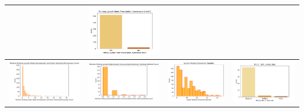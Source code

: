 \begin{center}
\begin{tabular}{ |c|c|c|c| }
		& \includegraphics[width=.25\textwidth]{NOTEBOOK/IMAGENES_CRUDAS/52} 
		\\  \hline
		\includegraphics[width=.25\textwidth]{NOTEBOOK/IMAGENES_CRUDAS/53} 
		& \includegraphics[width=.25\textwidth]{NOTEBOOK/IMAGENES_CRUDAS/54} 
		& \includegraphics[width=.25\textwidth]{NOTEBOOK/IMAGENES_CRUDAS/55} 
		& \includegraphics[width=.25\textwidth]{NOTEBOOK/IMAGENES_CRUDAS/56} 
		\\  \hline         
	\end{tabular} 
\end{center} 

